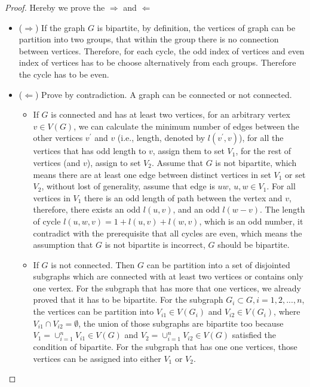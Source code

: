			\begin{proof}
				Hereby we prove the $\Rightarrow$ and $\Leftarrow$
				\begin{itemize}
					\item ($\Rightarrow$) If the graph $G$ is bipartite, by definition, the vertices of graph can be partition into two groups, that within the group there is no connection between vertices. Therefore, for each cycle, the odd index of vertices and even index of vertices has to be choose alternatively from each groups. Therefore the cycle has to be even.
					\item ($\Leftarrow$) Prove by contradiction. A graph can be connected or not connected.
					\begin{itemize}
						\item If $G$ is connected and has at least two vertices, for an arbitrary vertex $v\in V(G)$, we can calculate the minimum number of edges between the other vertices $v^\prime$ and $v$ (i.e., length, denoted by $l(v^\prime, v)$), for all the vertices that has odd length to $v$, assign them to set $V_1$, for the rest of vertices (and $v$), assign to set $V_2$. Assume that $G$ is not bipartite, which means there are at least one edge between distinct vertices in set $V_1$ or set $V_2$, without lost of generality, assume that edge is $uw$, $u, w\in V_1$. For all vertices in $V_1$ there is an odd length of path between the vertex and $v$, therefore, there exists an odd $l(u,v)$, and an odd $l(w-v)$. The length of cycle $l(u, w, v) = 1 + l(u, v) + l(w, v)$, which is an odd number, it contradict with the prerequisite that all cycles are even, which means the assumption that $G$ is not bipartite is incorrect, $G$ should be bipartite.
						\item If $G$ is not connected. Then $G$ can be partition into a set of disjointed subgraphs which are connected with at least two vertices or contains only one vertex. For the subgraph that has more that one vertices, we already proved that it has to be bipartite. For the subgraph $G_i \subset G, i = 1, 2, ..., n$, the vertices can be partition into $V_{i1} \in V(G_i)$ and $V_{i2} \in V(G_i)$, where $V_{i1} \cap V_{i2} = \emptyset$, the union of those subgraphs are bipartite too because $V_1 = \cup_{i=1}^n V_{i1} \in V(G)$ and $V_2 = \cup_{i=1}^n V_{i2} \in V(G)$ satisfied the condition of bipartite. For the subgraph that has one one vertices, those vertices can be assigned into either $V_1$ or $V_2$.
					\end{itemize}
				\end{itemize}
			\end{proof}


